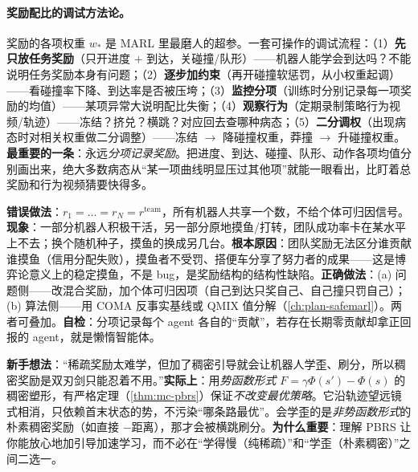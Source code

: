 \paragraph{奖励配比的调试方法论。}
奖励的各项权重 $w_*$ 是 MARL 里最磨人的超参。一套可操作的调试流程：（1）\textbf{先只放任务奖励}（只开进度 $+$ 到达，关碰撞/队形）——机器人能学会到达吗？不能说明任务奖励本身有问题；（2）\textbf{逐步加约束}（再开碰撞软惩罚，从小权重起调）——看碰撞率下降、到达率是否被压垮；（3）\textbf{监控分项}（训练时分别记录每一项奖励的均值）——某项异常大说明配比失衡；（4）\textbf{观察行为}（定期录制策略行为视频/轨迹）——冻结？挤兑？横跳？对应回去查哪种病态；（5）\textbf{二分调权}（出现病态时对相关权重做二分调整）——冻结 $\to$ 降碰撞权重，莽撞 $\to$ 升碰撞权重。\textbf{最重要的一条}：永远\emph{分项记录奖励}。把进度、到达、碰撞、队形、动作各项均值分别画出来，绝大多数病态从“某一项曲线明显压过其他项”就能一眼看出，比盯着总奖励和行为视频猜要快得多。

\begin{pitfall}
\textbf{错误做法}：$r_1{=}\dots{=}r_N{=}r^{\text{team}}$，所有机器人共享一个数，不给个体可归因信号。\textbf{现象}：一部分机器人积极干活，另一部分原地摸鱼/打转，团队成功率卡在某水平上不去；换个随机种子，摸鱼的换成另几台。\textbf{根本原因}：团队奖励无法区分谁贡献谁摸鱼（信用分配失败），摸鱼者不受罚、搭便车分享了努力者的成果——这是博弈论意义上的稳定摸鱼，不是 bug，是奖励结构的结构性缺陷。\textbf{正确做法}：(a) 问题侧——改混合奖励，加个体可归因项（自己到达只奖自己、自己撞只罚自己）；(b) 算法侧——用 COMA 反事实基线或 QMIX 值分解（\cref{ch:plan-safemarl}）。两者可叠加。\textbf{自检}：分项记录每个 agent 各自的“贡献”，若存在长期零贡献却拿正回报的 agent，就是懒惰智能体。
\end{pitfall}

\begin{pitfall}
\textbf{新手想法}：“稀疏奖励太难学，但加了稠密引导就会让机器人学歪、刷分，所以稠密奖励是双刃剑只能忍着不用。”\textbf{实际上}：用\emph{势函数形式} $F=\gamma\Phi(s')-\Phi(s)$ 的稠密塑形，有严格定理（\cref{thm:mc-pbrs}）保证\emph{不改变最优策略}。它沿轨迹望远镜式相消，只依赖首末状态的势，不污染“哪条路最优”。会学歪的是\emph{非势函数形式}的朴素稠密奖励（如直接 $-$距离），那才会被横跳刷分。\textbf{为什么重要}：理解 PBRS 让你能放心地加引导加速学习，而不必在“学得慢（纯稀疏）”和“学歪（朴素稠密）”之间二选一。
\end{pitfall}

